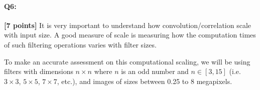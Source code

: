 
\pagebreak
\paragraph{Q6:} \textbf{[7 points]}
    It is very important to understand how convolution/correlation scale with input size. A good measure of scale is measuring how the computation times of such filtering operations varies with filter sizes.
    
    To make an accurate assessment on this computational scaling, we will be using filters with dimensions $n \times n$ where $n$ is an odd number and $n \in [3, 15]$ (i.e. $3\times3$, $5\times5$, $7\times7$, etc.), and images of sizes between 0.25 to 8 megapixels.

